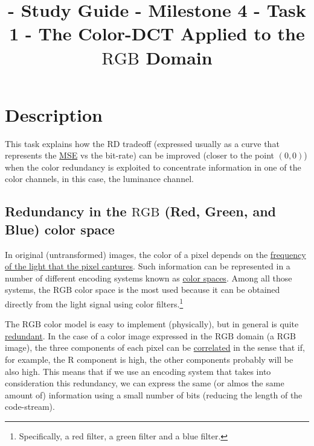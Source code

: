 

\title{\SM{} - Study Guide - Milestone 4 - Task 1 - The Color-DCT Applied to the $\text{RGB}$ Domain}

\maketitle

\tableofcontents

\section{Description}

This task explains how the RD tradeoff (expressed usually as a curve
that represents the
\href{https://en.wikipedia.org/wiki/Mean_squared_error}{MSE} vs the
bit-rate) can be improved (closer to the point $(0,0)$) when the color
redundancy is exploited to concentrate information in one of the color
channels, in this case, the luminance channel.

\subsection{Redundancy in the $\text{RGB}$ (Red, Green, and Blue) color space}

In original (untransformed) images, the color of a pixel depends on
the \href{https://en.wikipedia.org/wiki/Visible_spectrum}{frequency of
  the light that the pixel captures}. Such information can be
represented in a number of different encoding systems known as
\href{https://en.wikipedia.org/wiki/Color_space}{color spaces}. Among
all those systems, the $\text{RGB}$ color space is the most used
because it can be obtained directly from the light signal using color
filters.\footnote{Specifically, a red filter, a green filter and a
blue filter.}

The $\text{RGB}$ color model is easy to implement (physically), but in
general is quite
\href{https://en.wikipedia.org/wiki/Data_redundancy}{redundant}.  In
the case of a color image expressed in the $\text{RGB}$ domain (a
$\text{RGB}$ image), the three components of each pixel can be
\href{https://en.wikipedia.org/wiki/Correlation_and_dependence}{correlated}
in the sense that if, for example, the R component is high, the other
components probably will be also high. This means that if we use an
encoding system that takes into consideration this redundancy, we can
express the same (or almos the same amount of) information using a
small number of bits (reducing the length of the code-stream).

